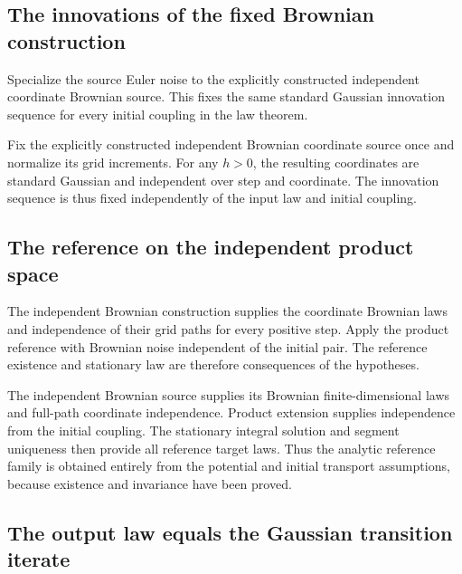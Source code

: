 \documentclass[11pt,a4paper]{report}
\begin{document}
\subsection{\texorpdfstring{The innovations of the fixed Brownian construction}{The innovations of the fixed Brownian construction}}
\label{report-step-UnadjustedLangevin-CanonicalULA-lean-3}


Specialize the source Euler noise to the explicitly constructed independent coordinate Brownian source. This fixes the same standard Gaussian innovation sequence for every initial coupling in the law theorem.



Fix the explicitly constructed independent Brownian coordinate source once and normalize its grid increments. For any \(h>0\), the resulting coordinates are standard Gaussian and independent over step and coordinate. The innovation sequence is thus fixed independently of the input law and initial coupling.

\subsection{\texorpdfstring{The reference on the independent product space}{The reference on the independent product space}}
\label{report-step-UnadjustedLangevin-CanonicalULA-lean-4}


The independent Brownian construction supplies the coordinate Brownian laws and independence of their grid paths for every positive step. Apply the product reference with Brownian noise independent of the initial pair. The reference existence and stationary law are therefore consequences of the hypotheses.



The independent Brownian source supplies its Brownian finite-dimensional laws and full-path coordinate independence. Product extension supplies independence from the initial coupling. The stationary integral solution and segment uniqueness then provide all reference target laws. Thus the analytic reference family is obtained entirely from the potential and initial transport assumptions, because existence and invariance have been proved.

\subsection{\texorpdfstring{The output law equals the Gaussian transition iterate}{The output law equals the Gaussian transition iterate}}
\label{report-step-UnadjustedLangevin-CanonicalULA-lean-5}
\end{document}
